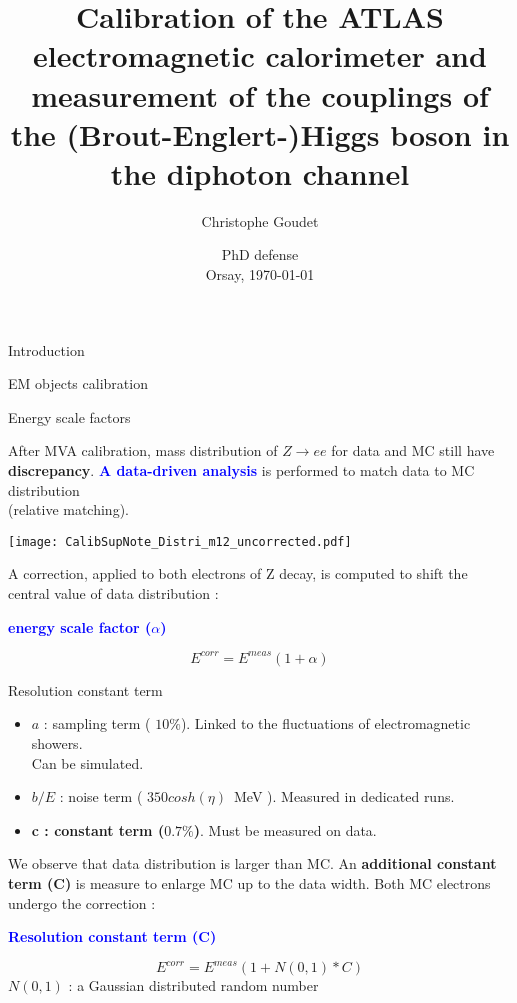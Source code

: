 \documentclass[a4paper]{beamer}
\title[Energy calibration \& Higgs couplings]{Calibration of the ATLAS electromagnetic calorimeter and measurement of the couplings of the (Brout-Englert-)Higgs boson in the diphoton channel}
\author[Goudet]{Christophe Goudet}
\institute[LAL]{\texttt{[image: LAL.jpg]} }
\date[Orsay, \today]{PhD defense \\ Orsay, \today}
\begin{document}
\transboxin
\begin{frame}
\maketitle
\end{frame}

\begin{frame}{Introduction}
\tableofcontents
\end{frame}




\begin{frame}{EM objects calibration}
\end{frame}
\begin{frame}{Energy scale factors}
  \begin{minipage}{0.49\linewidth}
    After MVA calibration, mass distribution of $Z\rightarrow ee$ for data and MC still have \\{\bf discrepancy}.
    \newline
    \textcolor{blue}{\bf A data-driven analysis } is performed to match data to MC distribution \\(relative matching).
  \end{minipage}
  \hfill
  \begin{minipage}{0.49\linewidth}
    \texttt{[image: CalibSupNote\_Distri\_m12\_uncorrected.pdf]}
  \end{minipage}

A correction, applied to both electrons of Z decay, is computed to shift the central value of data distribution : 
\begin{center} \textcolor{blue}{\bf energy scale factor ($\alpha$)} \end{center}
$$E^{corr}=E^{meas}(1+\alpha)$$
\end{frame}

\begin{frame}{Resolution constant term}
  
  \begin{itemize}
  \item $a$ : sampling term ( $10\%$). Linked to the fluctuations of electromagnetic showers. \\Can be simulated.
  \item $b/E$ : noise term ( $350cosh(\eta )$~MeV ). Measured in dedicated runs.
  \item {\bf c : constant term ($0.7\%$)}. Must be measured on data.
  \end{itemize}
  We observe that data distribution is larger than MC. 
  An {\bf additional constant term (C)} is measure to enlarge MC up to the data width.
  Both MC electrons undergo the correction :
  \begin{center}\textcolor{blue}{\bf Resolution constant term (C) }\end{center}
  $$E^{corr} = E^{meas}(1+N(0,1)*C)$$
  $N(0,1)$ : a Gaussian distributed random number
\end{frame}
\end{document}

